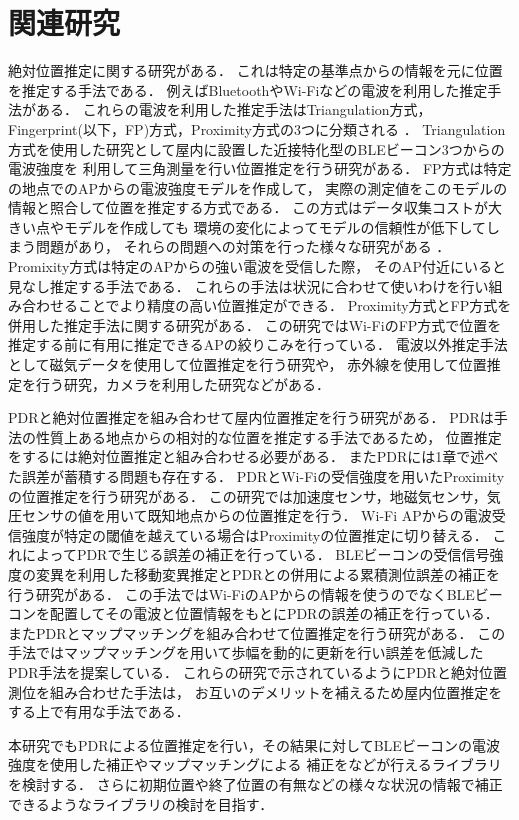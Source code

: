 

\section{関連研究}
絶対位置推定に関する研究がある．
これは特定の基準点からの情報を元に位置を推定する手法である．
例えばBluetoothやWi-Fiなどの電波を利用した推定手法がある．
これらの電波を利用した推定手法はTriangulation方式，Fingerprint(以下，FP)方式，Proximity方式の3つに分類される
\cite{wireless-lan-summary}．
Triangulation方式を使用した研究として屋内に設置した近接特化型のBLEビーコン3つからの電波強度を
利用して三角測量を行い位置推定を行う研究がある\cite{ble-indoor}\cite{ble-tandem}\cite{triangulation-kalman}．
FP方式は特定の地点でのAPからの電波強度モデルを作成して，
実際の測定値をこのモデルの情報と照合して位置を推定する方式である．
この方式はデータ収集コストが大きい点やモデルを作成しても
環境の変化によってモデルの信頼性が低下してしまう問題があり，
それらの問題への対策を行った様々な研究がある
\cite{gaussian-mixture-model}
\cite{wireless-lan-cost-reduction}
\cite{fingerprint-auto-update}
\cite{wi-fi-fingerprint-domain}．
Promixity方式は特定のAPからの強い電波を受信した際，
そのAP付近にいると見なし推定する手法である．
これらの手法は状況に合わせて使いわけを行い組み合わせることでより精度の高い位置推定ができる．
Proximity方式とFP方式を併用した推定手法に関する研究がある\cite{proximity-fingerprint}．
この研究ではWi-FiのFP方式で位置を推定する前に有用に推定できるAPの絞りこみを行っている．
電波以外推定手法として磁気データを使用して位置推定を行う研究\cite{pdr-mag}や，
赤外線を使用して位置推定を行う研究\cite{infrared}，カメラを利用した研究\cite{camera}などがある．

PDRと絶対位置推定を組み合わせて屋内位置推定を行う研究がある．
PDRは手法の性質上ある地点からの相対的な位置を推定する手法であるため，
位置推定をするには絶対位置推定と組み合わせる必要がある．
またPDRには1章で述べた誤差が蓄積する問題も存在する．
PDRとWi-Fiの受信強度を用いたProximityの位置推定を行う研究\cite{pdr-wifi}がある．
この研究では加速度センサ，地磁気センサ，気圧センサの値を用いて既知地点からの位置推定を行う．
Wi-Fi APからの電波受信強度が特定の閾値を越えている場合はProximityの位置推定に切り替える．
これによってPDRで生じる誤差の補正を行っている．
BLEビーコンの受信信号強度の変異を利用した移動変異推定とPDRとの併用による累積測位誤差の補正を行う研究\cite{pdr-ble}がある．
この手法ではWi-FiのAPからの情報を使うのでなくBLEビーコンを配置してその電波と位置情報をもとにPDRの誤差の補正を行っている．
またPDRとマップマッチングを組み合わせて位置推定を行う研究\cite{pdr-map}がある．
この手法ではマップマッチングを用いて歩幅を動的に更新を行い誤差を低減したPDR手法を提案している．
これらの研究で示されているようにPDRと絶対位置測位を組み合わせた手法は，
お互いのデメリットを補えるため屋内位置推定をする上で有用な手法である．

本研究でもPDRによる位置推定を行い，その結果に対してBLEビーコンの電波強度を使用した補正やマップマッチングによる
補正をなどが行えるライブラリを検討する．
さらに初期位置や終了位置の有無などの様々な状況の情報で補正できるようなライブラリの検討を目指す．

